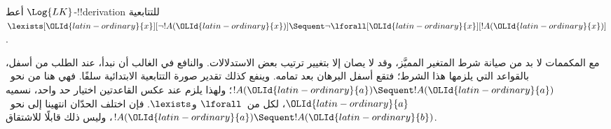 \documentclass[../../../include/open-logic-section]{subfiles}
\begin{document}


\begin{ex}
أعط $\Log{LK}$-!!{derivation} للتتابعية
$\lexists[{\OLId{latin-ordinary}{x}}][\lnot !A({\OLId{latin-ordinary}{x}})] \Sequent \lnot \lforall[{\OLId{latin-ordinary}{x}}][!A({\OLId{latin-ordinary}{x}})]$.

مع المكممات لا بد من صيانة شرط المتغير المميَّز، وقد لا يصان إلا بتغيير ترتيب بعض الاستدلالات.
والنافع في الغالب أن نبدأ، عند الطلب من أسفل، بالقواعد التي يلزمها هذا الشرط؛ فتقع أسفل البرهان بعد تمامه.
وينفع كذلك تقدير صورة التتابعية الابتدائية سلفًا. فهي هنا من نحو~$!A({\OLId{latin-ordinary}{a}}) \Sequent !A({\OLId{latin-ordinary}{a}})$؛ ولهذا يلزم عند عكس القاعدتين اختيار حد واحد، نسميه
${\OLId{latin-ordinary}{a}}$، لكل من~$\lforall$ و$\lexists$. فإن اختلف الحدّان انتهينا إلى نحو~$!A({\OLId{latin-ordinary}{a}}) \Sequent !A({\OLId{latin-ordinary}{b}})$، وليس ذلك قابلًا للاشتقاق.


\end{ex}
\end{document}
